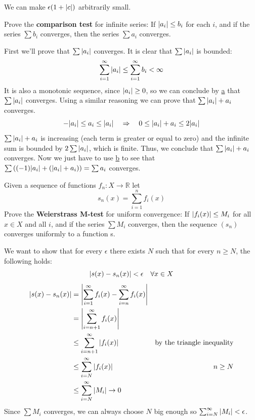 \documentclass{article}
\def\R{\mathbb{R}}
\DeclarePairedDelimiter\abs{\lvert}{\rvert}%
\begin{document}
    We can make $\epsilon(1 + \abs{c})$ arbitrarily small.
    \begin{tcolorbox}[title=Exercise c]
        \label{21.11c}
        Prove the \textbf{comparison test} for infinite series: If $\abs{a_i} \leq b_i$ for each $i$, and if the series $\sum{b_i}$ converges, then the series $\sum{a_i}$ converges.
    \end{tcolorbox}
    \noindent
    First we'll prove that $\sum{\abs{a_i}}$ converges. It is clear that $\sum{\abs{a_i}}$ is bounded:
    \begin{equation*}
        \sum_{i=1}^\infty{\abs{a_i}} \leq \sum_{i=1}^\infty{b_i} < \infty
    \end{equation*}
    It is also a monotonic sequence, since $\abs{a_i} \geq 0$, so we can conclude by \hyperref[21.11a]{a} that $\sum{\abs{a_i}}$ converges. Using a similar reasoning we can prove that $\sum{\abs{a_i} + a_i}$ converges. 
    \begin{equation*}
        -\abs{a_i} \leq a_i \leq \abs{a_i} \quad \Rightarrow \quad 0 \leq \abs{a_i} + a_i \leq 2\abs{a_i}
    \end{equation*}
    $\sum{\abs{a_i} + a_i}$ is increasing (each term is greater or equal to zero) and the infinite sum is bounded by $2\sum{\abs{a_i}}$, which is finite. Thus, we conclude that $\sum{\abs{a_i} + a_i}$ converges. Now we just have to use \hyperref[21.11b]{b} to see that $\sum{((-1)\abs{a_i} + (\abs{a_i} + a_i))} = \sum{a_i}$ converges. 
    \begin{tcolorbox}[title=Exercise d]
        Given a sequence of functions $f_n \colon X \to \R$ let
        \begin{equation*}
            s_n(x) = \sum_{i=1}^n{f_i(x)}
        \end{equation*}
        Prove the \textbf{Weierstrass M-test} for uniform convergence: If $\abs{f_i(x)} \leq M_i$ for all $x \in X$ and all $i$, and if the series $\sum{M_i}$ converges, then the sequence $(s_n)$ converges uniformly to a function s.
    \end{tcolorbox}
    \noindent
    We want to show that for every $\epsilon$ there exists $N$ such that for every $n \geq N$, the following holds:
    \begin{equation*}
        \abs{s(x) - s_n(x)} < \epsilon \quad \forall x \in X
    \end{equation*}
    \begin{align*}
        \abs{s(x) - s_n(x)} &= \abs*{\sum_{i=1}^\infty{f_i(x)} - \sum_{i=n}^\infty{f_i(x)}} \\
        &= \abs*{\sum_{i=n+1}^\infty{f_i(x)}} \\
        &\leq \sum_{i=n+1}^\infty{\abs{f_i(x)}} & \text{by the triangle inequality} \\
        &\leq \sum_{i=N}^\infty{\abs{f_i(x)}} & n \geq N \\
        &\leq \sum_{i=N}^\infty{\abs{M_i}} \rightarrow 0
    \end{align*}
    Since $\sum{M_i}$ converges, we can always choose $N$ big enough so $\sum_{i=N}^\infty{\abs{M_i}} < \epsilon$.
    
\end{document}
